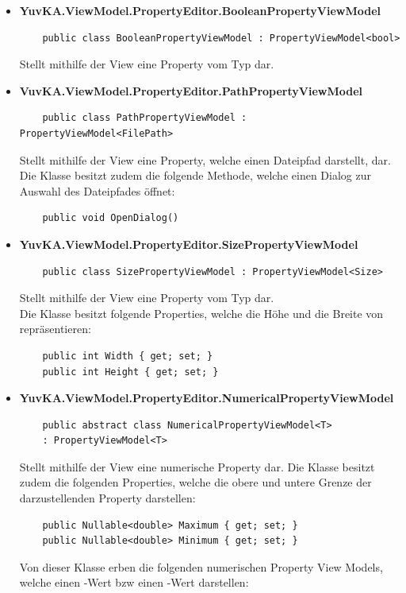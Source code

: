 \begin{itemize}

\item{\textbf{YuvKA.ViewModel.PropertyEditor.BooleanPropertyViewModel}}
	\begin{verbatim}
	public class BooleanPropertyViewModel : PropertyViewModel<bool>
	\end{verbatim}
	Stellt mithilfe der View eine Property vom Typ  dar.

\item{\textbf{VuvKA.ViewModel.PropertyEditor.PathPropertyViewModel}}
	\begin{verbatim}
	public class PathPropertyViewModel : PropertyViewModel<FilePath>
	\end{verbatim}
	Stellt mithilfe der View eine Property, welche einen Dateipfad darstellt, dar.\\
	Die Klasse besitzt zudem die folgende Methode, welche einen Dialog zur Auswahl des Dateipfades öffnet:
	\begin{verbatim}
	public void OpenDialog()
	\end{verbatim}

\item{\textbf{YuvKA.ViewModel.PropertyEditor.SizePropertyViewModel}}
	\begin{verbatim}
	public class SizePropertyViewModel : PropertyViewModel<Size>
	\end{verbatim}
	Stellt mithilfe der View eine Property vom Typ  dar.\\
	Die Klasse besitzt folgende Properties, welche die Höhe und die Breite von  repräsentieren:
	\begin{verbatim}
	public int Width { get; set; }
	public int Height { get; set; } 
	\end{verbatim}

\item{\textbf{YuvKA.ViewModel.PropertyEditor.NumericalPropertyViewModel}}
	\begin{verbatim}
	public abstract class NumericalPropertyViewModel<T> 
	: PropertyViewModel<T>
	\end{verbatim}
	Stellt mithilfe der View eine numerische Property dar. Die Klasse besitzt zudem die folgenden Properties, welche die obere und untere Grenze der darzustellenden Property darstellen:
	\begin{verbatim}
	public Nullable<double> Maximum { get; set; }
	public Nullable<double> Minimum { get; set; }
	\end{verbatim}
	Von dieser Klasse erben die folgenden numerischen Property View Models, welche einen -Wert bzw einen -Wert darstellen:


\end{itemize}
